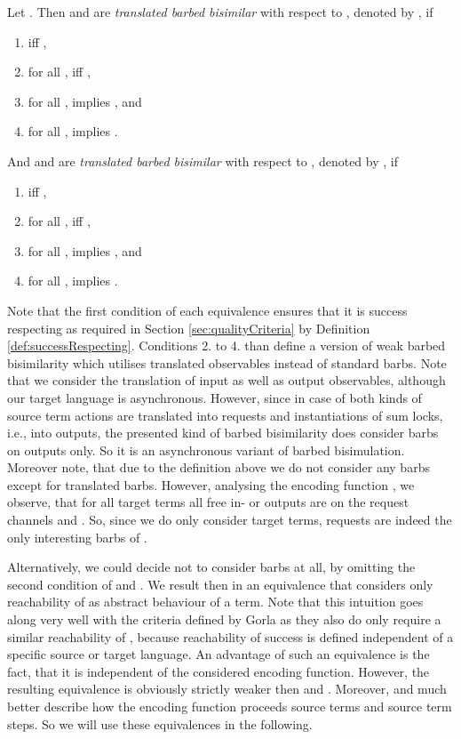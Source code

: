 \documentclass[]{llncs}
\begin{document}
\begin{definition} \label{def:transBarbBisim}
	Let . Then  and  are \emph{translated barbed bisimilar} with respect to , denoted by , if
	\begin{enumerate}
		\item  iff ,
		\item for all ,  iff ,
		\item for all ,  implies , and
		\item for all ,  implies .
	\end{enumerate}
	And  and  are \emph{translated barbed bisimilar} with respect to , denoted by , if
	\begin{enumerate}
		\item  iff ,
		\item for all ,  iff ,
		\item for all ,  implies , and
		\item for all ,  implies .
	\end{enumerate}
\end{definition}

Note that the first condition of each equivalence ensures that it is success respecting as required in Section \ref{sec:qualityCriteria} by Definition \ref{def:successRespecting}. Conditions 2. to 4. than define a version of weak barbed bisimilarity which utilises translated observables instead of standard barbs. Note that we consider the translation of input as well as output observables, although our target language is asynchronous. However, since in case of  both kinds of source term actions are translated into requests and instantiations of sum locks, i.e., into outputs, the presented kind of barbed bisimilarity does consider barbs on outputs only. So it is an asynchronous variant of barbed bisimulation. Moreover note, that due to the definition above we do not consider any barbs except for translated barbs. However, analysing the encoding function , we observe, that for all target terms all free in- or outputs are on the request channels  and . So, since we do only consider target terms, requests are indeed the only interesting barbs of .

Alternatively, we could decide not to consider barbs at all, by omitting the second condition of  and . We result then in an equivalence that considers only reachability of  as abstract behaviour of a term. Note that this intuition goes along very well with the criteria defined by Gorla as they also do only require a similar reachability of , because reachability of success is defined independent of a specific source or target language. An advantage of such an equivalence is the fact, that it is independent of the considered encoding function. However, the resulting equivalence is obviously strictly weaker then  and . Moreover,  and  much better describe how the encoding function proceeds source terms and \simulate source term steps. So we will use these equivalences in the following.
\end{document}
